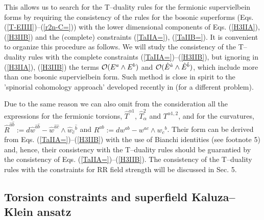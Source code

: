 \documentclass[a4paper,11pt]{article}
\begin{document}
This allows us to search for the T--duality rules for the fermionic 
supervielbein forms by requiring the consistency of the rules for the bosonic 
superforms (Eqs. (\ref{T-EIIII})--(\ref{r2n-C=})) 
with the 
lower dimensional components of Eqs. (\ref{H3IIA}), (\ref{H3IIB}) and 
the (complete) constraints (\ref{TaIIA=}),  (\ref{TaIIB=}). 
It is convenient to organize this procedure as follows. 
We will study the consistency of the T--duality rules with the complete 
constraints (\ref{TaIIA=})--(\ref{H3IIB}), 
but ignoring in (\ref{H3IIA}), (\ref{H3IIB}) the terms 
${\cal O} (E^a\wedge E^b)$ and ${\cal O} (\hat{E}^{\hat{a}}\wedge 
\hat{E}^{\hat{b}})$, which include more than 
one bosonic supervielbein form. 
Such method is close in spirit to the 
'spinorial cohomology approach' developed recently in \cite{NC} (for 
 a different problem).  


Due to the same reason we can also omit from the consideration all the 
expressions for the fermionic torsions, 
$\hat{T}^{\alpha 1}$, $\hat{T}_{\alpha}^2$ and 
${T}^{\alpha 1,2}$, and for the curvatures,  
$\hat{R}^{\hat{a}\hat{b}}:= d\hat{w}^{\hat{a}\hat{b}}- 
\hat{w}^{\hat{a}\hat{c}}\wedge \hat{w}_{\hat{c}}{}^{\hat{b}}$ 
and  $R^{ab}:= dw^{ab}- w^{ac}\wedge w_c{}^b$.  
Their form can be derived from Eqs. (\ref{TaIIA=})--(\ref{H3IIB}) 
with the use of Bianchi identities (see footnote 5) 
and, hence, their consistency with the 
T--duality rules should be guarantied by the consistency of 
Eqs. (\ref{TaIIA=})--(\ref{H3IIB}). 
The consistency of the T--duality rules with the constraints for 
RR field strength will be discussed in Sec. 5.  

\subsection{Torsion constraints and superfield Kaluza--Klein ansatz} 
\end{document}
